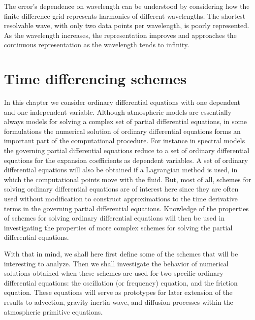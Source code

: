 The error's dependence on wavelength can be understood by considering how the finite difference grid represents harmonics of different wavelengths. The shortest resolvable wave, with only two data points per wavelength, is poorly represented. As the wavelength increases, the representation improves and approaches the continuous representation as the wavelength tends to infinity.



\section{Time differencing schemes}
In this chapter we consider ordinary differential equations with one dependent and one independent variable. Although atmospheric models are essentially always models for solving a complex set of partial differential equations, in some formulations the numerical solution of ordinary differential equations forms an important part of the computational procedure. For instance in spectral models the governing partial differential equations reduce to a set of ordinary differential equations for the expansion coefficients as dependent variables. A set of ordinary differential equations will also be obtained if a Lagrangian method is used, in which the computational points move with the fluid. But, most of all, schemes for solving ordinary differential equations are of interest here since they are often used without modification to construct approximations to the time derivative terms in the governing partial differential equations. Knowledge of the properties of schemes for solving ordinary differential equations will then be used in investigating the properties of more complex schemes for solving the partial differential equations.

With that in mind, we shall here first define some of the schemes that will be interesting to analyze. Then we shall investigate the behavior of numerical solutions obtained when these schemes are used for two specific ordinary differential equations: the oscillation (or frequency) equation, and the friction equation. These equations will serve as prototypes for later extension of the results to advection, gravity-inertia wave, and diffusion processes within the atmospheric primitive equations.

